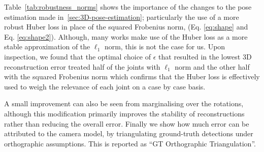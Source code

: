 \documentclass[10pt,twocolumn,letterpaper]{article}
\begin{document}
\begin{table}[tb]
\caption[width=\columnwidth] {Reconstruction error for different
   variants of our approach (see section \ref{sec:3D-pose-estimation}
   for details.) Huber loss (2 cameras) shows the mean and standard
   deviation of the reconstruction using only a pair of cameras at
   right angles with one another. GT Orthographic Triangulation shows
   the error due to the use of an orthographic camera, i.e. the the
   reconstruction error given perfect 
   detections.\label{tab:robustness_norms}}
\end{table}

Table~\ref{tab:robustness_norms} shows the importance of the changes to the pose
estimation made in~\ref{sec:3D-pose-estimation}; particularly the use of a more
robust Huber loss in place of the squared Frobenius norm, (Eq. \ref{eq:shape}
and Eq. \ref{eq:shape2}). 
Although, many works make use of the Huber loss as a more stable
approximation of the $\ell_1$ norm, this is not the case for us. Upon
inspection, we found that the optimal choice of $\epsilon$ that resulted in
the lowest 3D reconstruction error treated half of the joints with
$\ell_1$ norm and the other half with the squared Frobenius norm which
confirms that the Huber loss is effectively used to weigh the
relevance of each joint on a case by case basis.




A small improvement can also be seen from marginalising over the
rotations, although this modification primarily  improves the stability of
reconstructions rather than reducing the overall error. Finally we show how much
error can be attributed to the camera model, by
triangulating ground-truth detections under orthographic assumptions. This is
reported as ``GT Orthographic Triangulation''. 
\end{document}
